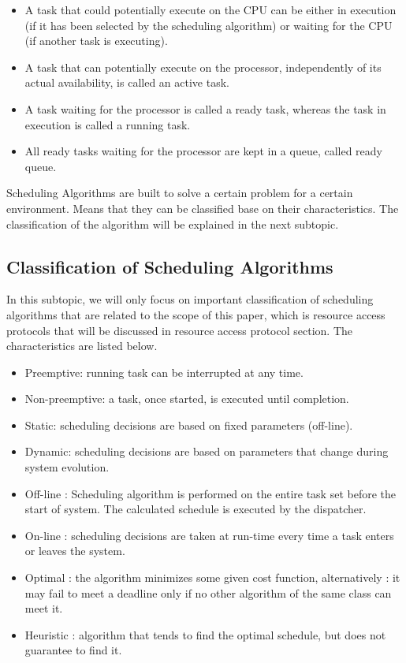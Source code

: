 \begin{itemize}
\item A task that could potentially execute on the CPU can be either in execution (if it has been selected by the scheduling algorithm) or waiting for the CPU (if another task is executing).

\item A task that can potentially execute on the processor, independently of its actual availability, is called an active task.

\item A task waiting for the processor is called a ready task, whereas the task in execution is called a running task.

\item All ready tasks waiting for the processor are kept in a queue, called ready queue.

\end{itemize}

Scheduling Algorithms are built to solve a certain problem for a certain environment. Means that they can be classified base on their characteristics. The classification of the algorithm will be explained in the next subtopic.

\subsection{Classification of Scheduling Algorithms}

In this subtopic, we will only focus on important classification of scheduling algorithms that are related to the scope of this paper, which is resource access protocols that will be discussed in resource access protocol section. The characteristics are listed below\cite{b5}.

\begin{itemize}
\item Preemptive: running task can be interrupted at any time.
\item Non-preemptive: a task, once started, is executed until completion.
\item Static: scheduling decisions are based on fixed parameters (off-line).
\item Dynamic: scheduling decisions are based on parameters that change during system evolution.
\item Off-line : Scheduling algorithm is performed on the entire task set before the start of system. The calculated schedule is executed by the dispatcher. 
\item On-line : scheduling decisions are taken at run-time every time a task enters or leaves the system.
\item Optimal : the algorithm minimizes some given cost function, alternatively : it may fail to meet a deadline only if no other algorithm of the same class can meet it.
\item Heuristic : algorithm that tends to find the optimal schedule, but does not guarantee to find it.
\end{itemize}


